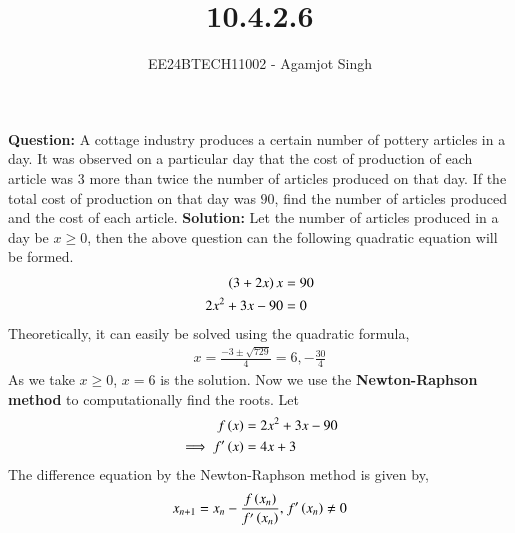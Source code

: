 \documentclass[journal]{IEEEtran}
\begin{document}

\vspace{3cm}

\title{10.4.2.6}
\author{EE24BTECH11002 - Agamjot Singh}
{\let\newpage\relax\maketitle}

\renewcommand{\thefigure}{\theenumi}
\renewcommand{\thetable}{\theenumi}
\setlength{\intextsep}{10pt} %

\textbf{Question:}
\newline
A cottage industry produces a certain number of pottery articles in a day. It was observed on a particular day that the cost of production of each article  was $3$ more than twice the number of articles produced on that day. If the total cost of production on that day was $90$, find the number of articles produced and the cost of each article.
\newline
\textbf{Solution:}
\newline
Let the number of articles produced in a day be $x \geq 0$, then the above question can the following quadratic equation will be formed.
\begin{align}
    \left(3 + 2x\right)x &= 90\\
    2x^2 + 3x - 90 &= 0
\end{align}
Theoretically, it can easily be solved using the quadratic formula,
\begin{align}
    x = \frac{-3 \pm \sqrt{729}}{4} = 6, -\frac{30}{4}
\end{align}
As we take $x\geq0$, $x = 6$ is the solution.
\newline
Now we use the \textbf{Newton-Raphson method} to computationally find the roots.
\newline
Let 
\begin{align}
    f\left(x\right) &= 2x^2 + 3x - 90\\
    \implies f^{\prime}\left(x\right) &= 4x + 3
\end{align}
The difference equation by the Newton-Raphson method is given by,
\begin{align}
    x_{n + 1} = x_n - \frac{f\left(x_n\right)}{f^{\prime}\left(x_n\right)} \text{, } f^{\prime}\left(x_n\right) \neq 0
\end{align}
\end{document}
